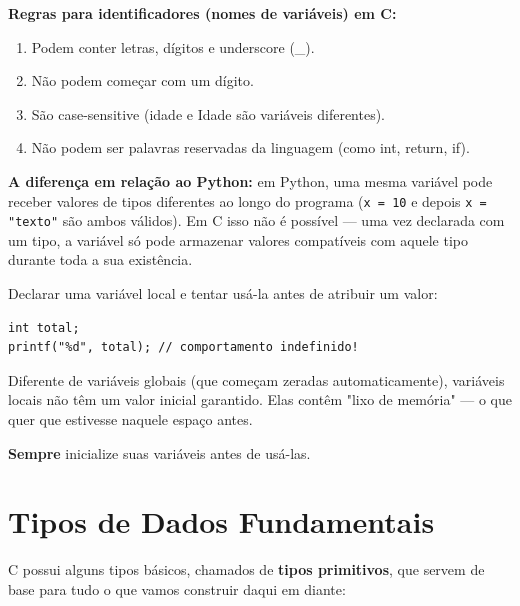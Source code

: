 \documentclass[12pt,a4paper,oneside]{extreport}
\begin{document}
\textbf{Regras para identificadores (nomes de variáveis) em C:}

\begin{enumerate}
    \item Podem conter letras, dígitos e underscore (\_).
    \item Não podem começar com um dígito.
    \item São case-sensitive (idade e Idade são variáveis diferentes).
    \item Não podem ser palavras reservadas da linguagem (como int, return, if).
\end{enumerate}

\textbf{A diferença em relação ao Python:} 
em Python, uma mesma variável pode receber valores de tipos diferentes ao longo do programa (\texttt{x = 10} e depois \texttt{x = "texto"} são ambos válidos). Em C isso não é possível — uma vez declarada com um tipo, a variável só pode armazenar valores compatíveis com aquele tipo durante toda a sua existência.


\begin{errocomum}

Declarar uma variável local e tentar usá-la antes de atribuir um valor:

\begin{lstlisting}
int total;
printf("%d", total); // comportamento indefinido!

\end{lstlisting}

Diferente de variáveis globais (que começam zeradas automaticamente), variáveis locais não têm um valor inicial garantido. Elas contêm "lixo de memória" — o que quer que estivesse naquele espaço antes. 

\textbf{Sempre} inicialize suas variáveis antes de usá-las.

    
\end{errocomum}



\section{Tipos de Dados Fundamentais}
C possui alguns tipos básicos, chamados de \textbf{tipos primitivos}, que servem de base para tudo o que vamos construir daqui em diante:
\end{document}
